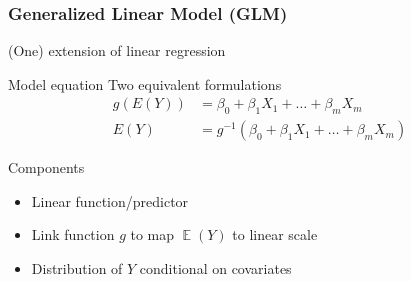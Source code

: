 \documentclass[
    utf8,
    aspectratio=169
]{beamer}  %
\DeclareMathOperator{\E}{\mathbb{E}}  %
\begin{document}
\begin{frame}
	\frametitle{Generalized Linear Model (GLM)}
	\begin{block}{(One) extension of linear regression}
	\end{block}
	
	\begin{block}{Model equation}
		Two equivalent formulations
		\begin{align*}
			g(E(Y)) &= \beta_0 + \beta_1 X_1 + \dots + \beta_m X_m \\
			E(Y) &= g^{-1}(\beta_0 + \beta_1 X_1 + \dots + \beta_m X_m)
		\end{align*}
	\end{block}
	
	\begin{block}{Components}
		\begin{itemize}
			\item Linear function/predictor
			\item Link function $g$ to map $\E(Y)$ to linear scale
			\item Distribution of $Y$ conditional on covariates
		\end{itemize}
	\end{block}
\end{frame}
\end{document}
